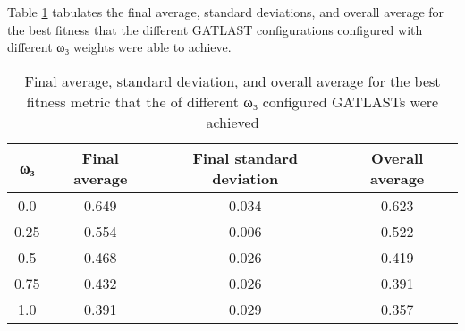 Table \ref{tab:HP:GA:GWeight:best fitness} tabulates the final average, standard deviations, and overall average for the best fitness that the different GATLAST configurations configured with different ω₃ weights were able to achieve.
\begin{table}[tbh!]
\centering
\begin{adjustbox}{trim=0cm 0cm 0cm 0cm, clip=true}
\begin{tabular}{|c|c|c|c|}
\hline
ω₃ & Final average & Final standard deviation & Overall average\\
\hline
0.0 & 0.649 & 0.034 & 0.623\\\hline
0.25 & 0.554 & 0.006 & 0.522\\\hline
0.5 & 0.468 & 0.026 & 0.419\\\hline
0.75 & 0.432 & 0.026 & 0.391\\\hline
1.0 & 0.391 & 0.029 & 0.357\\\hline
\end{tabular}
\end{adjustbox}
\caption{Final average, standard deviation, and overall average for the best fitness metric that the of different ω₃ configured GATLASTs were achieved}
\label{tab:HP:GA:GWeight:best fitness}
\end{table}